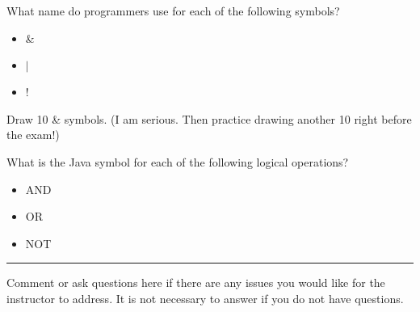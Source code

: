 \documentclass[letterpaper,12pt]{exam}
\begin{document}
\begin{questions}
\begin{samepage}
    \question What name do programmers use for each of the following symbols?
      \begin{itemize}
        \item \&
        \vspace{5mm}
        \item $|$
        \vspace{5mm}
        \item !
        \vspace{5mm}
       \end{itemize}
\end{samepage}

\begin{samepage}
    \question Draw 10 \& symbols.  (I am serious.  Then practice drawing another 10 right before the exam!)
    \vspace{10mm}
\end{samepage}
\begin{samepage}
    \question What is the Java symbol for each of the following logical operations?
      \begin{itemize}
        \item AND
        \vspace{5mm}
        \item OR
        \vspace{5mm}
        \item NOT
        \vspace{5mm}
       \end{itemize}
\end{samepage}



\begin{samepage}
    \begin{center}
    \rule{0.8\textwidth}{.4pt}
    \end{center}
	\question Comment or ask questions here if there are any issues you would like for the instructor to address.  It is not necessary to answer if you do not have questions.
	\vspace{30mm}
\end{samepage}

\end{questions}
\end{document}
